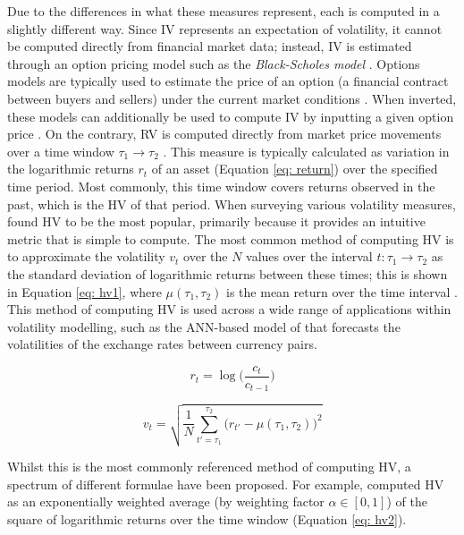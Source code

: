 \documentclass[a4paper, 11pt]{report}
\begin{document}
    Due to the differences in what these measures represent, each is computed in a slightly different way. Since IV represents an expectation of volatility, it cannot be computed directly from financial market data; instead, IV is estimated through an option pricing model such as the \emph{Black-Scholes model} \citep{black-1973}. Options models are typically used to estimate the price of an option (a financial contract between buyers and sellers) under the current market conditions \citep{wu-2015}. When inverted, these models can additionally be used to compute IV by inputting a given option price \citep{tino-2001}. On the contrary, RV is computed directly from market price movements over a time window $\tau_1 \to \tau_2$ \citep{ge-2022}. This measure is typically calculated as variation in the logarithmic returns $r_t$ of an asset (Equation \ref{eq: return}) over the specified time period. Most commonly, this time window covers returns observed in the past, which is the HV of that period. When surveying various volatility measures, \citet{ge-2022} found HV to be the most popular, primarily because it provides an intuitive metric that is simple to compute. The most common method of computing HV is to approximate the volatility $v_t$ over the $N$ values over the interval $t \colon \tau_1 \to \tau_2$ as the standard deviation of logarithmic returns between these times; this is shown in Equation \ref{eq: hv1}, where $\mu(\tau_1, \tau_2)$ is the mean return over the time interval \citep{ge-2022}. This method of computing HV is used across a wide range of applications within volatility modelling, such as the ANN-based model of \citet{lahmiri-2017} that forecasts the volatilities of the exchange rates between currency pairs.

    \begin{equation}
        \label{eq: return}
        r_t = \log\Big(\frac{c_t}{c_{t-1}}\Big)
    \end{equation}

    \begin{equation}
        \label{eq: hv1}
        v_t = \sqrt{ \frac{1}{N} \sum_{t' = \tau_1}^{\tau_2} \big( r_{t'} - \mu(\tau_1, \tau_2) \big)^2 }
    \end{equation}

    Whilst this is the most commonly referenced method of computing HV, a spectrum of different formulae have been proposed. For example, \citet{tino-2001} computed HV as an exponentially weighted average (by weighting factor $\alpha \in [0, 1]$) of the square of logarithmic returns over the time window (Equation \ref{eq: hv2}). 
\end{document}
